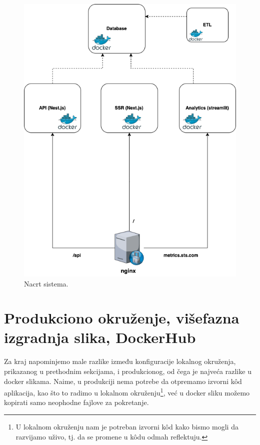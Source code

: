 \documentclass[12pt,oneside]{memoir}
\begin{document}
\begin{figure}[h, width=0.5]
  \centering
  \includegraphics[width=1\textwidth]{docs/images/ch_6/dockernadnginxfinal.png} 
  \caption{Nacrt sistema.}
  \label{fig:dockerandnginxfinal}
\end{figure}


\newpage
\section{Produkciono okruženje, višefazna izgradnja slika, DockerHub}

Za kraj napominjemo male razlike između konfiguracije lokalnog okruženja, prikazanog u prethodnim sekcijama, i produkcionog, od čega je najveća razlike u docker slikama. Naime, u produkciji nema potrebe da otpremamo izvorni k\^{o}d aplikacija, kao što to radimo u lokalnom okruženju\footnote{U lokalnom okruženju nam je potreban izvorni k\^{o}d kako bismo mogli da razvijamo uživo, tj. da se promene u k\^{o}du odmah reflektuju.}, već u docker sliku možemo kopirati samo neophodne fajlove za pokretanje.
\end{document}
